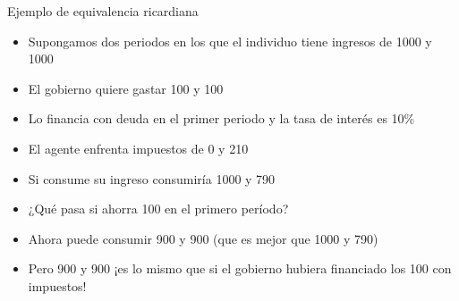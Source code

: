 \documentclass{beamer}
\begin{document}
\begin{frame}{Ejemplo de equivalencia ricardiana}
    
\begin{itemize}
    \item Supongamos dos periodos en los que el individuo tiene ingresos de 1000 y 1000
    \item El gobierno quiere gastar 100 y 100 
    \item Lo financia con deuda en el primer periodo y la tasa de interés es 10\%
    \item El agente enfrenta impuestos de 0 y 210
    \item Si consume su ingreso consumiría 1000 y 790 
    \item ¿Qué pasa si ahorra 100 en el primero período?
    \item Ahora puede consumir 900 y 900 (que es mejor que 1000 y 790)
    \item Pero 900 y 900 ¡es lo mismo que si el gobierno hubiera financiado los 100 con impuestos! 
\end{itemize}

\end{frame}









\end{document}
